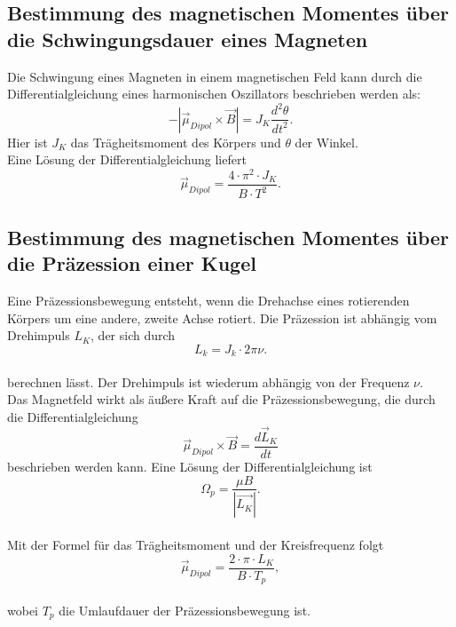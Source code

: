 \subsection{Bestimmung des magnetischen Momentes über die Schwingungsdauer eines Magneten}
Die Schwingung eines Magneten in einem magnetischen Feld kann durch die Differentialgleichung eines harmonischen Oszillators beschrieben werden als:
\begin{equation*}
  -|\vec{\mu}_{Dipol} \times \vec{B}| = J_K \frac{d^2 \theta}{dt^2}.
\end{equation*}
Hier ist $J_K$ das Trägheitsmoment des Körpers und $\theta$ der Winkel.
\\Eine Lösung der Differentialgleichung liefert
  \begin{equation}
    \vec{\mu}_{Dipol}= \frac{4 \cdot \pi^2 \cdot J_K}{B \cdot T^2}.
  \label{eqn:bmom2}
  \end{equation}

\subsection{Bestimmung des magnetischen Momentes über die Präzession einer Kugel}
Eine Präzessionsbewegung entsteht, wenn die Drehachse eines rotierenden Körpers um eine andere, zweite Achse rotiert.
Die Präzession ist abhängig vom Drehimpuls $L_K$, der sich durch
\begin{equation}
 L_k = J_k \cdot 2 \pi \nu.
\label{eqn:lk}
\end{equation}
\\berechnen lässt. Der Drehimpuls ist wiederum abhängig von der Frequenz $\nu$.
\\Das Magnetfeld wirkt als äußere Kraft auf die Präzessionsbewegung, die durch die Differentialgleichung
\begin{equation*}
  \vec{\mu}_{Dipol} \times \vec{B} = \frac{d \vec{L}_{K}}{dt}
\end{equation*}
beschrieben werden kann. Eine Lösung der Differentialgleichung ist
\begin{equation*}
  \Omega_p = \frac{\mu B}{|\vec{L_K}|}.
\end{equation*}
\\Mit der Formel für das Trägheitsmoment und der Kreisfrequenz folgt
  \begin{equation}
    \vec{\mu}_{Dipol} = \frac{2 \cdot \pi \cdot L_K}{B \cdot T_p},
  \label{eqn:bmom3}
  \end{equation}
\\wobei $T_p$ die Umlaufdauer der Präzessionsbewegung ist.
